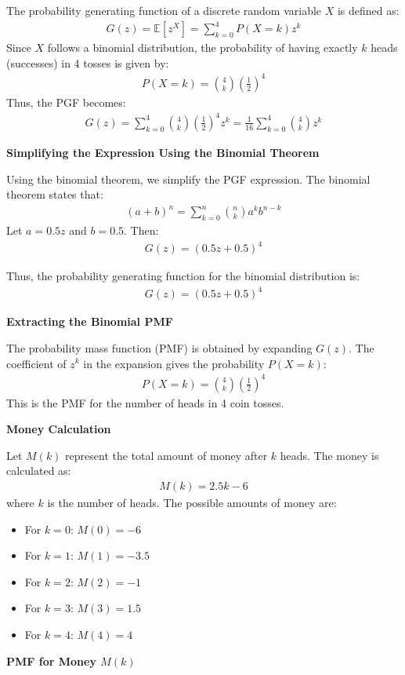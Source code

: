 \documentclass[journal]{IEEEtran}
\numberwithin{equation}{enumi}
\numberwithin{figure}{enumi}
\begin{document}
The probability generating function of a discrete random variable \( X \) is defined as:
\begin{align}
G(z) = \mathbb{E}[z^X] = \sum_{k=0}^{4} P(X = k) z^k
\end{align}
Since \( X \) follows a binomial distribution, the probability of having exactly \( k \) heads (successes) in 4 tosses is given by:
\begin{align}
P(X = k) = \binom{4}{k} \left( \frac{1}{2} \right)^4
\end{align}
Thus, the PGF becomes:
\begin{align}
G(z) = \sum_{k=0}^{4} \binom{4}{k} \left( \frac{1}{2} \right)^4 z^k = \frac{1}{16} \sum_{k=0}^{4} \binom{4}{k} z^k
\end{align}

 \textbf{Simplifying the Expression Using the Binomial Theorem}

Using the binomial theorem, we simplify the PGF expression. The binomial theorem states that:
\begin{align}
(a + b)^n = \sum_{k=0}^{n} \binom{n}{k} a^k b^{n-k}
\end{align}
Let \( a = 0.5z \) and \( b = 0.5 \). Then:
\begin{align}
G(z) = (0.5z + 0.5)^4
\end{align}

Thus, the probability generating function for the binomial distribution is:
\begin{align}
G(z) = (0.5z + 0.5)^4
\end{align}

\textbf{Extracting the Binomial PMF}

The probability mass function (PMF) is obtained by expanding \( G(z) \). The coefficient of \( z^k \) in the expansion gives the probability \( P(X = k) \):
\begin{align}
P(X = k) = \binom{4}{k} \left( \frac{1}{2} \right)^4
\end{align}
This is the PMF for the number of heads in 4 coin tosses.

\textbf{Money Calculation}

Let \( M(k) \) represent the total amount of money after \( k \) heads. The money is calculated as:
\begin{align}
M(k) = 2.5k - 6
\end{align}
where \( k \) is the number of heads. The possible amounts of money are:
\begin{itemize}
    \item For \( k = 0 \): \( M(0) = -6 \)
    \item For \( k = 1 \): \( M(1) = -3.5 \)
    \item For \( k = 2 \): \( M(2) = -1 \)
    \item For \( k = 3 \): \( M(3) = 1.5 \)
    \item For \( k = 4 \): \( M(4) = 4 \)
\end{itemize}
\textbf{PMF for Money \( M(k) \)}
\end{document}
